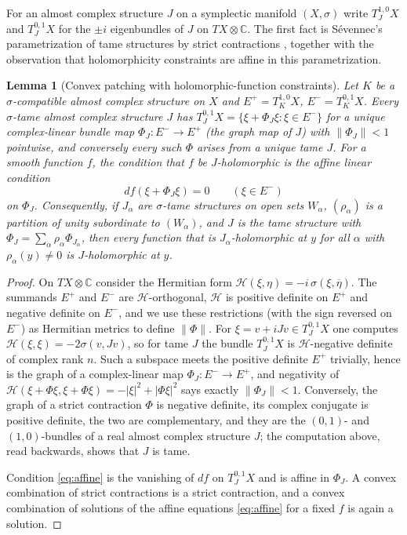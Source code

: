 \documentclass[11pt]{article}
\newtheorem{lemma}[theorem]{Lemma}
\theoremstyle{remark}
\newcommand{\C}{\mathbb C}
\begin{document}
For an almost complex structure $J$ on a symplectic manifold $(X,\sigma)$
write $T^{1,0}_JX$ and $T^{0,1}_JX$ for
the $\pm i$ eigenbundles of $J$ on $TX\otimes\C$. The first fact is
S\'evennec's parametrization of tame structures by strict contractions
\cite[Theorem 2.37]{Wendl}, together with the observation that
holomorphicity constraints are affine in this parametrization.

\begin{lemma}[Convex patching with holomorphic-function constraints]
\label{lem:convex}
Let $K$ be a $\sigma$-compatible almost complex structure on $X$ and
$E^+=T^{1,0}_KX$, $E^-=T^{0,1}_KX$. Every $\sigma$-tame almost complex
structure $J$ has $T^{0,1}_JX=\{\xi+\Phi_J\xi:\xi\in E^-\}$ for a unique
complex-linear bundle map $\Phi_J\colon E^-\to E^+$ (the \emph{graph
map} of $J$) with $\lVert\Phi_J\rVert<1$ pointwise, and conversely every
such $\Phi$ arises from a unique tame $J$. For a smooth function $f$,
the condition that $f$ be $J$-holomorphic is the affine linear condition
\begin{equation}\label{eq:affine}
 df(\xi+\Phi_J\xi)=0\qquad(\xi\in E^-)
\end{equation}
on $\Phi_J$. Consequently, if $J_\alpha$ are $\sigma$-tame structures on
open sets $W_\alpha$, $(\rho_\alpha)$ is a partition of unity
subordinate to $(W_\alpha)$, and $J$ is the tame structure with
$\Phi_J=\sum_\alpha\rho_\alpha\Phi_{J_\alpha}$, then every function that
is $J_\alpha$-holomorphic at $y$ for all $\alpha$ with $\rho_\alpha(y)\ne0$
is $J$-holomorphic at $y$.
\end{lemma}

\begin{proof}
On $TX\otimes\C$ consider the Hermitian form
$\mathcal H(\xi,\eta)=-i\,\sigma(\xi,\overline\eta)$. The summands $E^+$
and $E^-$ are $\mathcal H$-orthogonal, $\mathcal H$ is positive
definite on $E^+$ and negative definite on $E^-$, and we use these
restrictions (with the sign reversed on $E^-$) as Hermitian metrics to
define $\lVert\Phi\rVert$. For $\xi=v+iJv\in T^{0,1}_JX$ one computes
$\mathcal H(\xi,\xi)=-2\sigma(v,Jv)$, so for tame $J$ the bundle
$T^{0,1}_JX$ is $\mathcal H$-negative definite of complex rank $n$.
Such a subspace meets the positive definite $E^+$ trivially, hence is
the graph of a complex-linear map $\Phi_J\colon E^-\to E^+$, and
negativity of $\mathcal H(\xi+\Phi\xi,\xi+\Phi\xi)=-|\xi|^2+|\Phi\xi|^2$
says exactly $\lVert\Phi_J\rVert<1$. Conversely, the graph of a strict
contraction $\Phi$ is negative definite, its complex conjugate is
positive definite, the two are complementary, and they are the
$(0,1)$- and $(1,0)$-bundles of a real almost complex structure $J$;
the computation above, read backwards, shows that $J$ is tame.

Condition \eqref{eq:affine} is the vanishing of $df$ on $T^{0,1}_JX$
and is affine in $\Phi_J$. A convex combination of strict contractions
is a strict contraction, and a convex combination of solutions of the
affine equations \eqref{eq:affine} for a fixed $f$ is again a solution.
\end{proof}
\end{document}
